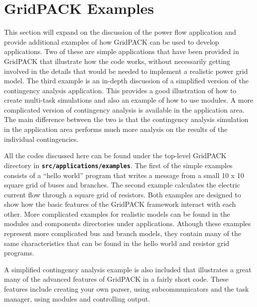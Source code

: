 \chapter{GridPACK Examples}

This section will expand on the discussion of the power flow application and provide additional examples of how GridPACK can be used to develop applications. Two of these are simple applications that have been provided in GridPACK that illustrate how the code works, without necessarily getting involved in the details that would be needed to implement a realistic power grid model. The third example is an in-depth discussion of a simplified version of the contingency analysis application. This provides a good illustration of how to create multi-task simulations and also an example of how to use modules. A more complicated version of contingency analysis is available in the application area. The main difference between the two is that the contingency analysis simulation in the application area performs much more analysis on the results of the individual contingencies.

All the codes discussed here can be found under the top-level GridPACK directory in \texttt{\textbf{src/applications/examples}}.
The first of the simple examples consists of a ``hello world'' program that writes a message from a small 10 x 10 square grid of buses and branches. The second example calculates the electric current flow through a square grid of resistors. Both examples are designed to show how the basic features of the GridPACK framework interact with each other. More complicated examples for realistic models can be found in the modules and components directories under applications. Athough these examples represent more complicated bus and branch models, they contain many of the same characteristics that can be found in the hello world and resistor grid programs.

A simplified contingency analysis example is also included that illustrates a great many of the advanced features of GridPACK in a fairly short code. These features include creating your own parser, using subcommunicators and the task manager, using modules and controlling output.
